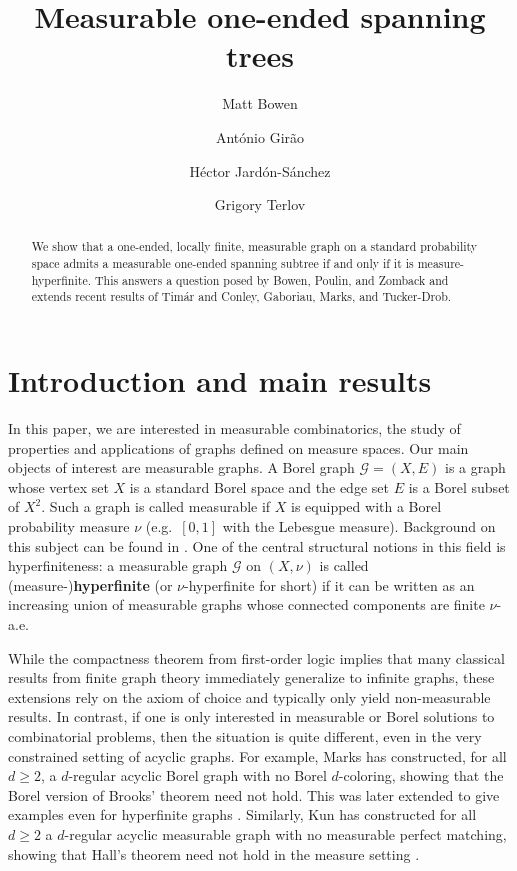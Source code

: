 \documentclass[letterpaper,11pt,reqno]{amsart}
\title{\sffamily Measurable one-ended spanning trees}
\date{}
\author[Bowen]{Matt Bowen}
\author[Girao]{António Girão}
\author[Sanchez]{H\'ector Jard\'on-S\'anchez}
\author[Terlov]{Grigory Terlov}
\theoremstyle{bfnote}
\theoremstyle{definition}
\newcommand{\0}{\varnothing}
\renewcommand{\geq}{\geqslant}
\numberwithin{equation}{section}
\begin{document}
\begin{abstract}
    We show that a one-ended, locally finite, measurable graph on a standard probability space admits a measurable one-ended spanning subtree if and only if it is measure-hyperfinite. This answers a question posed by Bowen, Poulin, and Zomback and extends recent results of Tim\'ar and Conley, Gaboriau, Marks, and Tucker-Drob.
\end{abstract}

\maketitle
\section{Introduction and main results}
In this paper, we are interested in measurable combinatorics, the study of properties and applications of graphs defined on measure spaces. Our main objects of interest are measurable graphs. A Borel graph $\mathcal{G}=(X,E)$ is a graph whose vertex set $X$ is a standard Borel space and the edge set $E$ is a Borel subset of $X^2$. Such a graph is called measurable if $X$ is  equipped with a Borel probability measure $\nu$ (e.g.\ $[0,1]$ with the Lebesgue measure). Background on this subject can be found in \cite{kechris.marks,pikhurko2020borel}. One of the central structural notions in this field is hyperfiniteness: a measurable graph $\mathcal{G}$ on $(X,\nu)$ is called (measure-)\textbf{hyperfinite} (or $\nu$-hyperfinite for short) if it can be written as an increasing union of measurable graphs whose connected components are finite $\nu$-a.e.

While the compactness theorem from first-order logic implies that many classical results from finite graph theory immediately generalize to infinite graphs, these extensions rely on the axiom of choice and typically only yield non-measurable results. 
In contrast, if one is only interested in measurable or Borel solutions to combinatorial problems, then the situation is quite different, even in the very constrained setting of acyclic graphs.  
For example, Marks \cite{Marks.determinacy} has constructed, for all $d\geq 2$, a $d$-regular acyclic Borel graph with no Borel $d$-coloring, showing that the Borel version of Brooks' theorem need not hold. 
This was later extended to give examples even for hyperfinite graphs \cite{conley2020borel}.
Similarly, Kun has constructed for all $d\geq 2$ a $d$-regular acyclic measurable graph with no measurable perfect matching, showing that Hall's theorem need not hold in the measure setting \cite{gabor.new}.
\end{document}
